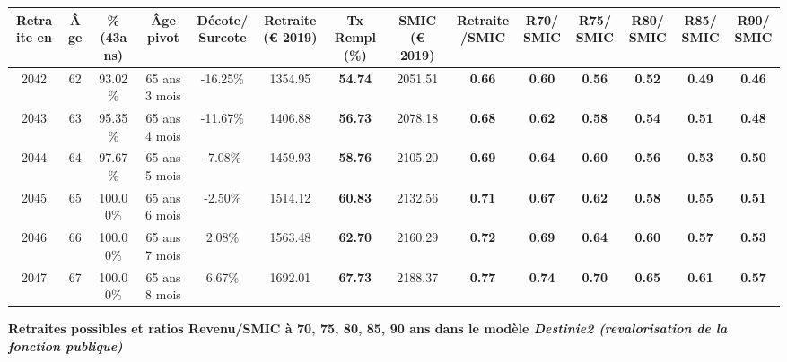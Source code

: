 \begin{adjustbox}{max width=\textwidth} 
\begin{tabular}[htb]{|c|c||c|c|c||c|c||c|c||c|c|c|c|c|} 
\hline 
 Retraite en &  Âge &  \%(43ans) &  Âge pivot &  Décote/Surcote &  Retraite (\euro{} 2019) &  Tx Rempl(\%) &  SMIC (\euro{} 2019) &  Retraite/SMIC &  R70/SMIC &  R75/SMIC &  R80/SMIC &  R85/SMIC &  R90/SMIC \\ 
\hline \hline 
 2042 &  62 &  93.02\% &  65 ans 3 mois &  -16.25\% &  1354.95 &  {\bf 54.74} &  2051.51 &  {\bf {\color{red} 0.66}} &  {\bf {\color{red} 0.60}} &  {\bf {\color{red} 0.56}} &  {\bf {\color{red} 0.52}} &  {\bf {\color{red} 0.49}} &  {\bf {\color{red} 0.46}} \\ 
\hline 
 2043 &  63 &  95.35\% &  65 ans 4 mois &  -11.67\% &  1406.88 &  {\bf 56.73} &  2078.18 &  {\bf {\color{red} 0.68}} &  {\bf {\color{red} 0.62}} &  {\bf {\color{red} 0.58}} &  {\bf {\color{red} 0.54}} &  {\bf {\color{red} 0.51}} &  {\bf {\color{red} 0.48}} \\ 
\hline 
 2044 &  64 &  97.67\% &  65 ans 5 mois &  -7.08\% &  1459.93 &  {\bf 58.76} &  2105.20 &  {\bf {\color{red} 0.69}} &  {\bf {\color{red} 0.64}} &  {\bf {\color{red} 0.60}} &  {\bf {\color{red} 0.56}} &  {\bf {\color{red} 0.53}} &  {\bf {\color{red} 0.50}} \\ 
\hline 
 2045 &  65 &  100.00\% &  65 ans 6 mois &  -2.50\% &  1514.12 &  {\bf 60.83} &  2132.56 &  {\bf {\color{red} 0.71}} &  {\bf {\color{red} 0.67}} &  {\bf {\color{red} 0.62}} &  {\bf {\color{red} 0.58}} &  {\bf {\color{red} 0.55}} &  {\bf {\color{red} 0.51}} \\ 
\hline 
 2046 &  66 &  100.00\% &  65 ans 7 mois &  2.08\% &  1563.48 &  {\bf 62.70} &  2160.29 &  {\bf {\color{red} 0.72}} &  {\bf {\color{red} 0.69}} &  {\bf {\color{red} 0.64}} &  {\bf {\color{red} 0.60}} &  {\bf {\color{red} 0.57}} &  {\bf {\color{red} 0.53}} \\ 
\hline 
 2047 &  67 &  100.00\% &  65 ans 8 mois &  6.67\% &  1692.01 &  {\bf 67.73} &  2188.37 &  {\bf {\color{red} 0.77}} &  {\bf {\color{red} 0.74}} &  {\bf {\color{red} 0.70}} &  {\bf {\color{red} 0.65}} &  {\bf {\color{red} 0.61}} &  {\bf {\color{red} 0.57}} \\ 
\hline 
\hline 
\end{tabular} 
\end{adjustbox} 
 
 \vspace{0.1cm} 
{\bf \noindent Retraites possibles et ratios Revenu/SMIC à 70, 75, 80, 85, 90 ans dans le modèle \emph{Destinie2 (revalorisation de la fonction publique)}}  
 
